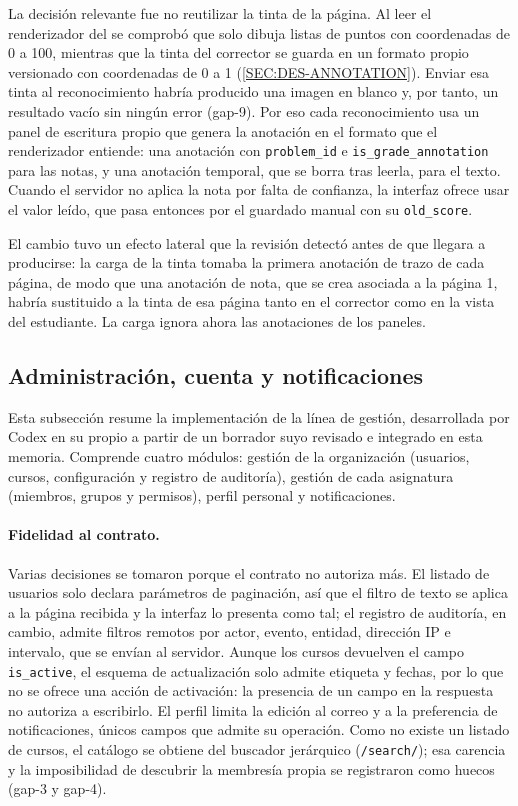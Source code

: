 La decisión relevante fue no reutilizar la tinta de la página. Al leer el renderizador del
 se comprobó que solo dibuja listas de puntos con coordenadas de 0 a 100,
mientras que la tinta del corrector se guarda en un formato propio versionado con
coordenadas de 0 a 1 (\cref{SEC:DES-ANNOTATION}). Enviar esa tinta al reconocimiento habría
producido una imagen en blanco y, por tanto, un resultado vacío sin ningún error (gap-9).
Por eso cada reconocimiento usa un panel de escritura propio que genera la anotación en el
formato que el renderizador entiende: una anotación con \texttt{problem\_id} e
\texttt{is\_grade\_annotation} para las notas, y una anotación temporal, que se borra tras
leerla, para el texto. Cuando el servidor no aplica la nota por falta de confianza, la
interfaz ofrece usar el valor leído, que pasa entonces por el guardado manual con su
\texttt{old\_score}.

El cambio tuvo un efecto lateral que la revisión detectó antes de que llegara a producirse:
la carga de la tinta tomaba la primera anotación de trazo de cada página, de modo que una
anotación de nota, que se crea asociada a la página 1, habría sustituido a la tinta
de esa página tanto en el corrector como en la vista del estudiante. La carga ignora ahora
las anotaciones de los paneles.

\subsection{Administración, cuenta y notificaciones}

Esta subsección resume la implementación de la línea de gestión, desarrollada por Codex en
su propio  a partir de un borrador suyo revisado e integrado en esta memoria.
Comprende cuatro módulos: gestión de la organización (usuarios, cursos, configuración y
registro de auditoría), gestión de cada asignatura (miembros, grupos y permisos), perfil
personal y notificaciones.

\paragraph{Fidelidad al contrato.} Varias decisiones se tomaron porque el contrato no
autoriza más. El listado de usuarios solo declara parámetros de paginación, así que el
filtro de texto se aplica a la página recibida y la interfaz lo presenta como tal; el
registro de auditoría, en cambio, admite filtros remotos por actor, evento, entidad,
dirección IP e intervalo, que se envían al servidor. Aunque los cursos devuelven el campo
\texttt{is\_active}, el esquema de actualización solo admite etiqueta y fechas, por lo que no
se ofrece una acción de activación: la presencia de un campo en la respuesta no autoriza a
escribirlo. El perfil limita la edición al correo y a la preferencia de notificaciones,
únicos campos que admite su operación. Como no existe un listado de cursos, el catálogo se
obtiene del buscador jerárquico (\texttt{/search/}); esa carencia y la imposibilidad de
descubrir la membresía propia se registraron como huecos (gap-3 y gap-4).

